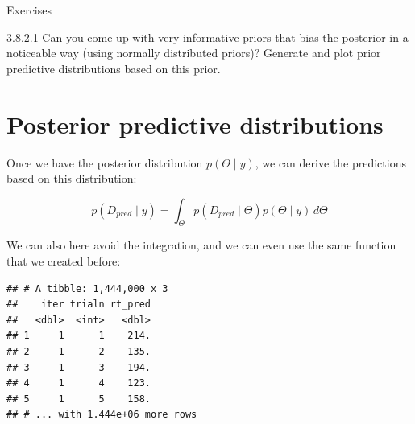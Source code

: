 \documentclass[12pt,ignorenonframetext,aspectratio=169]{beamer}
\newenvironment{Shaded}{\begin{snugshade}}{\end{snugshade}}
\newcommand{\DataTypeTok}[1]{\textcolor[rgb]{0.13,0.29,0.53}{#1}}
\newcommand{\KeywordTok}[1]{\textcolor[rgb]{0.13,0.29,0.53}{\textbf{#1}}}
\newcommand{\NormalTok}[1]{#1}
\newcommand{\OperatorTok}[1]{\textcolor[rgb]{0.81,0.36,0.00}{\textbf{#1}}}
\newcommand{\StringTok}[1]{\textcolor[rgb]{0.31,0.60,0.02}{#1}}
\begin{document}
\begin{frame}

\begin{block}{\color{blue} Exercises}

3.8.2.1 Can you come up with very informative priors that bias the posterior in a noticeable way (using normally distributed priors)? Generate and plot prior predictive distributions based on this prior.

\end{block}

\end{frame}

\hypertarget{sec:ppd}{%
\section{Posterior predictive distributions}\label{sec:ppd}}

\begin{frame}

Once we have the posterior distribution \(p(\Theta\mid y)\), we can derive the predictions based on this distribution:

\begin{equation}
p(D_{pred}\mid y )=\int_\Theta p(D_{pred}\mid \Theta) p(\Theta\mid y)\, d\Theta
\end{equation}

\end{frame}

\begin{frame}[fragile]

We can also here avoid the integration, and we can even use the same function that we created before:

\scriptsize

\begin{Shaded}
\end{Shaded}

\begin{verbatim}
## # A tibble: 1,444,000 x 3
##    iter trialn rt_pred
##   <dbl>  <int>   <dbl>
## 1     1      1    214.
## 2     1      2    135.
## 3     1      3    194.
## 4     1      4    123.
## 5     1      5    158.
## # ... with 1.444e+06 more rows
\end{verbatim}

\normalsize

\end{frame}
\end{document}
